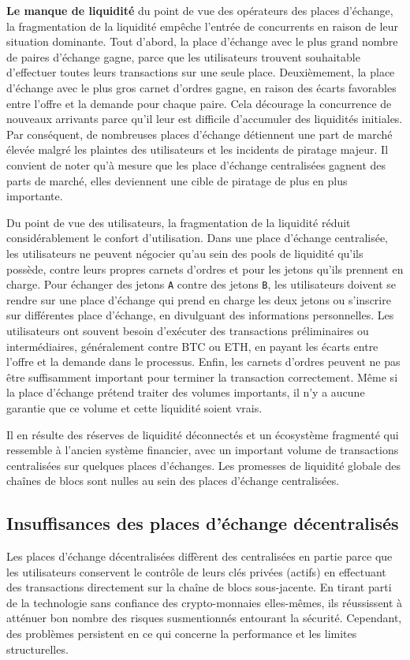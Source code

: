 \documentclass[UTF8,nofonts]{article}
\begin{document}
\begin{multicols}{2}
\textbf{Le manque de liquidité} du point de vue des opérateurs des places d’échange, la fragmentation de la liquidité empêche l'entrée de concurrents en raison de leur situation dominante. Tout d'abord, la place d’échange avec le plus grand nombre de paires d'échange gagne, parce que les utilisateurs trouvent souhaitable d'effectuer toutes leurs transactions sur une seule place. Deuxièmement, la place d’échange avec le plus gros carnet d'ordres gagne, en raison des écarts favorables entre l’offre et la demande pour chaque paire. Cela décourage la concurrence de nouveaux arrivants parce qu'il leur est difficile d'accumuler des liquidités initiales. Par conséquent, de nombreuses places d’échange détiennent une part de marché élevée malgré les plaintes des utilisateurs et les incidents de piratage majeur. Il convient de noter qu'à mesure que les place d'échange centralisées gagnent des parts de marché, elles deviennent une cible de piratage de plus en plus importante.

Du point de vue des utilisateurs, la fragmentation de la liquidité réduit considérablement le confort d’utilisation. Dans une place d'échange centralisée, les utilisateurs ne peuvent négocier qu'au sein des pools de liquidité qu’ils possède, contre leurs propres carnets d'ordres et pour les jetons qu’ils prennent en charge. Pour échanger des jetons \verb|A| contre des jetons \verb|B|, les utilisateurs doivent se rendre sur une place d’échange qui prend en charge les deux jetons ou s'inscrire sur différentes place d’échange, en divulguant des informations personnelles. Les utilisateurs ont souvent besoin d'exécuter des transactions préliminaires ou intermédiaires, généralement contre BTC ou ETH, en payant les écarts entre l’offre et la demande dans le processus. Enfin, les carnets d'ordres peuvent ne pas être suffisamment important pour terminer la transaction correctement. Même si la place d’échange prétend traiter des volumes importants, il n'y a aucune garantie que ce volume et cette liquidité soient vrais\cite{fakevolume}.

Il en résulte des réserves de liquidité déconnectés et un écosystème fragmenté qui ressemble à l'ancien système financier, avec un important volume de transactions centralisées sur quelques places d’échanges. Les promesses de liquidité globale des chaînes de blocs sont nulles au sein des places d’échange centralisées.

\subsection{Insuffisances des places d'échange décentralisés}
Les places d’échange décentralisées diffèrent des centralisées en partie parce que les utilisateurs conservent le contrôle de leurs clés privées (actifs) en effectuant des transactions directement sur la chaîne de blocs sous-jacente. En tirant parti de la technologie sans confiance des crypto-monnaies elles-mêmes, ils réussissent à atténuer bon nombre des risques susmentionnés entourant la sécurité. Cependant, des problèmes persistent en ce qui concerne la performance et les limites structurelles. 


\end{multicols}
\end{document}
